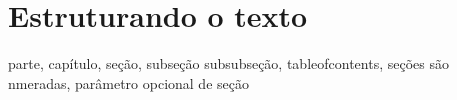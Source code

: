 \section{Estruturando o texto}

parte, capítulo, seção, subseção subsubseção, tableofcontents, seções
são nmeradas, parâ\-metro opcional de seção



